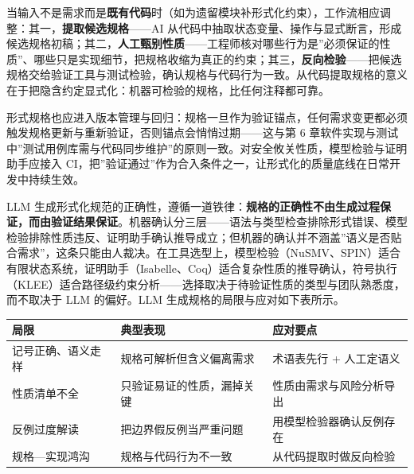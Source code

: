 \documentclass[
]{ctexbook}
\newcounter{none}
\begin{document}
当输入不是需求而是\textbf{既有代码}时（如为遗留模块补形式化约束），工作流相应调整：其一，\textbf{提取候选规格}------AI
从代码中抽取状态变量、操作与显式断言，形成候选规格初稿；其二，\textbf{人工甄别性质}------工程师核对哪些行为是''必须保证的性质''、哪些只是实现细节，把规格收缩为真正的约束；其三，\textbf{反向检验}------把候选规格交给验证工具与测试检验，确认规格与代码行为一致。从代码提取规格的意义在于把隐含约定显式化：机器可检验的规格，比任何注释都可靠。

形式规格也应进入版本管理与回归：规格一旦作为验证锚点，任何需求变更都必须触发规格更新与重新验证，否则锚点会悄悄过期------这与第
6
章软件实现与测试中''测试用例库需与代码同步维护''的原则一致。对安全攸关性质，模型检验与证明助手应接入
CI，把''验证通过''作为合入条件之一，让形式化的质量底线在日常开发中持续生效。

LLM
生成形式化规范的正确性，遵循一道铁律：\textbf{规格的正确性不由生成过程保证，而由验证结果保证}。机器确认分三层------语法与类型检查排除形式错误、模型检验排除性质违反、证明助手确认推导成立；但机器的确认并不涵盖''语义是否贴合需求''，这条只能由人裁决。在工具选型上，模型检验（NuSMV、SPIN）适合有限状态系统，证明助手（Isabelle、Coq）适合复杂性质的推导确认，符号执行（KLEE）适合路径级约束分析------选择取决于待验证性质的类型与团队熟悉度，而不取决于
LLM 的偏好。LLM 生成规格的局限与应对如下表所示。

{\def\LTcaptype{none} %
\begin{longtable}[]{@{}
  >{\raggedright\arraybackslash}p{}
  >{\raggedright\arraybackslash}p{}
  >{\raggedright\arraybackslash}p{}@{}}
\toprule\noalign{}
\begin{minipage}[b]{\linewidth}\raggedright
局限
\end{minipage} & \begin{minipage}[b]{\linewidth}\raggedright
典型表现
\end{minipage} & \begin{minipage}[b]{\linewidth}\raggedright
应对要点
\end{minipage} \\
\midrule\noalign{}
\endhead
\bottomrule\noalign{}
\endlastfoot
记号正确、语义走样 & 规格可解析但含义偏离需求 & 术语表先行 +
人工定语义 \\
性质清单不全 & 只验证易证的性质，漏掉关键 & 性质由需求与风险分析导出 \\
反例过度解读 & 把边界假反例当严重问题 & 用模型检验器确认反例存在 \\
规格---实现鸿沟 & 规格与代码行为不一致 & 从代码提取时做反向检验 \\
\end{longtable}
}
\end{document}
